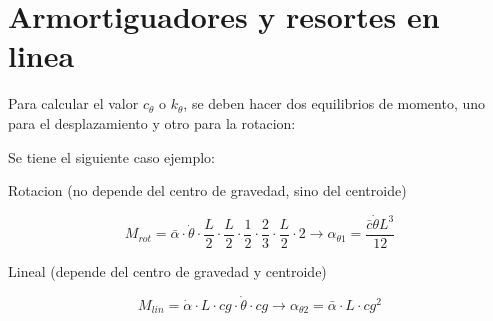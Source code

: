\documentclass{article}  %
\begin{document}
\section{Armortiguadores y resortes en linea}

Para calcular el valor $c_\theta$ o $k_\theta$, se deben hacer dos equilibrios de momento, uno para el desplazamiento y otro para la rotacion:

Se tiene el siguiente caso ejemplo:

Rotacion (no depende del centro de gravedad, sino del centroide)

\begin{equation}
    M_{rot} = \bar{\alpha}\cdot \dot{\theta}\cdot \frac{L}{2}\cdot \frac{L}{2}\cdot \frac{1}{2}\cdot \frac{2}{3}\cdot \frac{L}{2} \cdot 2 \rightarrow \alpha_{\theta 1} = \frac{\bar{c} \dot{\theta} L^3}{12}
\end{equation}

Lineal (depende del centro de gravedad y centroide)

\begin{equation}
    M_{lin} = \dot{\alpha} \cdot L \cdot cg \cdot \dot{\theta} \cdot cg \rightarrow \alpha_{\theta 2} = \bar{\alpha} \cdot L \cdot cg^2
\end{equation}
\end{document}
